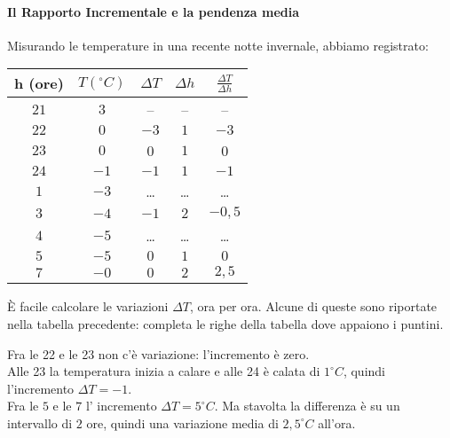 \paragraph{Il Rapporto Incrementale e la pendenza media}
\label{paragraph:differenziazione_ri}
\begin{esempio}
Misurando le temperature in una recente notte invernale, abbiamo registrato:

\noindent \begin{minipage}{0.48\textwidth}
 \begin{center}
\begin{tabular}{ccccc}\toprule
h (ore) & \(T (^\circ \! C)\) & \(\Delta T\) & \(\Delta h\)
             & \(\frac{\Delta T}{\Delta h}\)\\\midrule
\(21\) & \(3\) & -- & -- & -- \\
\(22\) & \(0\) & \(-3\) & \(1\) &\(-3\) \\
\(23\) & \(0\) & 0 & \(1\) & 0 \\
\(24\) & \(-1\) & \(-1\) & \(1\) & \(-1\) \\
\(1\) & \(-3\) &\dots &\dots & \dots\\
\(3\)  & \(-4\) & \(-1\) & \(2\) &\(-0,5\)\\
\(4\)  & \(-5\) &\dots &\dots & \dots\\
\(5\)  & \(-5\) & \(0\)  & \(1\) &\(0\)\\
\(7\)  & \(-0\) & \(0\) & \(2\) & \(2,5\)
\\ \bottomrule
\end{tabular}
\label{tab:temperaturea}
\end{center}
\end{minipage}
 \hfill
\begin{minipage}{.48 \textwidth}
\begin{inaccessibleblock}
\begin{center} \scalebox{.8}{\temperaturea} \end{center}
\end{inaccessibleblock}
\label{graf:temperaturea}
\end{minipage}

È facile calcolare le variazioni \(\Delta T\), ora per ora. 
Alcune di queste sono riportate nella tabella precedente: 
completa le righe della tabella dove appaiono i puntini.

Fra le 22 e le 23 non c'è variazione: l'incremento è zero. \\
Alle 23 la temperatura inizia a calare e alle 24 è calata di 
\(1^\circ C\), quindi l'incremento \( \Delta T=-1\). \\
Fra le \(5\) e le \(7\) l' incremento \(\Delta T= 5 ^\circ C\). 
Ma stavolta la differenza è su un intervallo di \(2\) ore, 
quindi una variazione media di \(2,5 ^\circ C\) all'ora.


\end{esempio}
